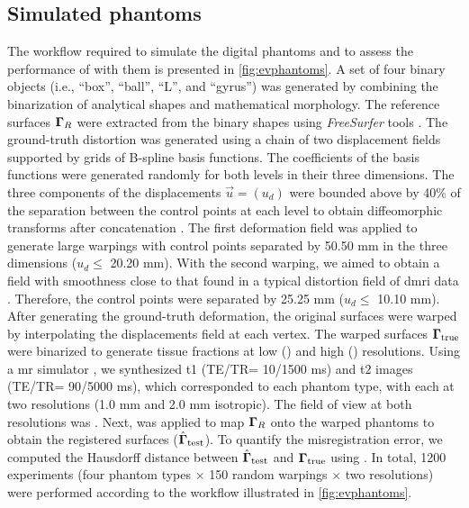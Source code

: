 \subsection{Simulated phantoms}\label{sec:digital_phantoms}
The workflow required to simulate the digital phantoms and to assess the performance of
  \regseg{} with them is presented in \autoref{fig:evphantoms}.
A set of four binary objects (i.e., ``box'', ``ball'', ``L'',
  and ``gyrus'') was generated by combining the binarization of
  analytical shapes and mathematical morphology.
The reference surfaces $\boldsymbol{\Gamma}_R$ were extracted from the binary shapes
  using \emph{FreeSurfer} tools \citep{fischl_freesurfer_2012}.
The ground-truth distortion was generated using a chain of two displacement
  fields supported by grids of B-spline basis functions.
The coefficients of the basis functions were generated randomly for
  both levels in their three dimensions.
The three components of the displacements $\vec{u} = (u_d)$
  were bounded above by 40\% of the separation between the control points
  at each level to obtain diffeomorphic transforms
  after concatenation \citep{rueckert_diffeomorphic_2006}.
The first deformation field was applied to generate large warpings
  with control points separated by 50.50 mm in the three dimensions
  ($u_d\leq$ 20.20 mm).
With the second warping, we aimed to obtain a field with smoothness
  close to that found in a typical distortion field of \gls*{dmri} data
  \citep{irfanoglu_susceptibility_2011}.
Therefore, the control points were separated by 25.25 mm ($u_d\leq$ 10.10 mm).
After generating the ground-truth deformation, the original surfaces
  were warped by interpolating the displacements field at each vertex.
The warped surfaces $\boldsymbol{\Gamma}_\text{true}$ were binarized to generate tissue fractions
  at low () and high () resolutions.
Using a \gls*{mr} simulator \citep{caruyer_phantomas_2014}, we synthesized
  \gls*{t1} (TE/TR= 10/1500 ms) and \gls*{t2} images (TE/TR= 90/5000 ms), which
  corresponded to each phantom type, with each at two resolutions
  (1.0 mm and 2.0 mm isotropic).
The field of view at both resolutions was .
Next, \regseg{} was applied to map $\boldsymbol{\Gamma}_R$ onto the warped phantoms to
  obtain the registered surfaces ($\hat{\boldsymbol{\Gamma}}_\text{test}$).
To quantify the misregistration error, we computed the Hausdorff distance between
 $\hat{\boldsymbol{\Gamma}}_\text{test}$ and $\boldsymbol{\Gamma}_\text{true}$ using \citep{commandeur_vtk_2011}.
In total, 1200 experiments (four phantom types $\times$ 150 random warpings $\times$ two resolutions) were
  performed according to the workflow illustrated in \autoref{fig:evphantoms}.

